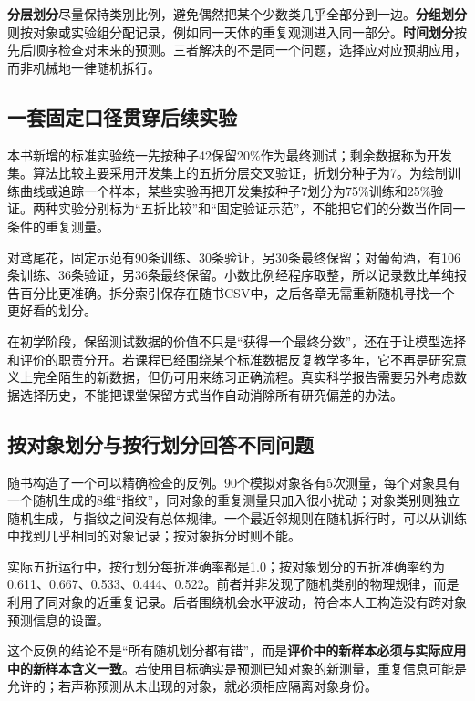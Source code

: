 \textbf{分层划分}尽量保持类别比例，避免偶然把某个少数类几乎全部分到一边。\textbf{分组划分}则按对象或实验组分配记录，例如同一天体的重复观测进入同一部分。\textbf{时间划分}按先后顺序检查对未来的预测。三者解决的不是同一个问题，选择应对应预期应用，而非机械地一律随机拆行。

\subsection{一套固定口径贯穿后续实验}
本书新增的标准实验统一先按种子42保留20\%作为最终测试；剩余数据称为开发集。算法比较主要采用开发集上的五折分层交叉验证，折划分种子为7。为绘制训练曲线或追踪一个样本，某些实验再把开发集按种子7划分为75\%训练和25\%验证。两种实验分别标为“五折比较”和“固定验证示范”，不能把它们的分数当作同一条件的重复测量。

对鸢尾花，固定示范有90条训练、30条验证，另30条最终保留；对葡萄酒，有106条训练、36条验证，另36条最终保留。小数比例经程序取整，所以记录数比单纯报告百分比更准确。拆分索引保存在随书CSV中，之后各章无需重新随机寻找一个更好看的划分。

在初学阶段，保留测试数据的价值不只是“获得一个最终分数”，还在于让模型选择和评价的职责分开。若课程已经围绕某个标准数据反复教学多年，它不再是研究意义上完全陌生的新数据，但仍可用来练习正确流程。真实科学报告需要另外考虑数据选择历史，不能把课堂保留方式当作自动消除所有研究偏差的办法。

\subsection{按对象划分与按行划分回答不同问题}
随书构造了一个可以精确检查的反例。90个模拟对象各有5次测量，每个对象具有一个随机生成的8维“指纹”，同对象的重复测量只加入很小扰动；对象类别则独立随机生成，与指纹之间没有总体规律。一个最近邻规则在随机拆行时，可以从训练中找到几乎相同的对象记录；按对象拆分时则不能。

实际五折运行中，按行划分每折准确率都是1.0；按对象划分的五折准确率约为0.611、0.667、0.533、0.444、0.522。前者并非发现了随机类别的物理规律，而是利用了同对象的近重复记录。后者围绕机会水平波动，符合本人工构造没有跨对象预测信息的设置。

这个反例的结论不是“所有随机划分都有错”，而是\textbf{评价中的新样本必须与实际应用中的新样本含义一致}。若使用目标确实是预测已知对象的新测量，重复信息可能是允许的；若声称预测从未出现的对象，就必须相应隔离对象身份。

